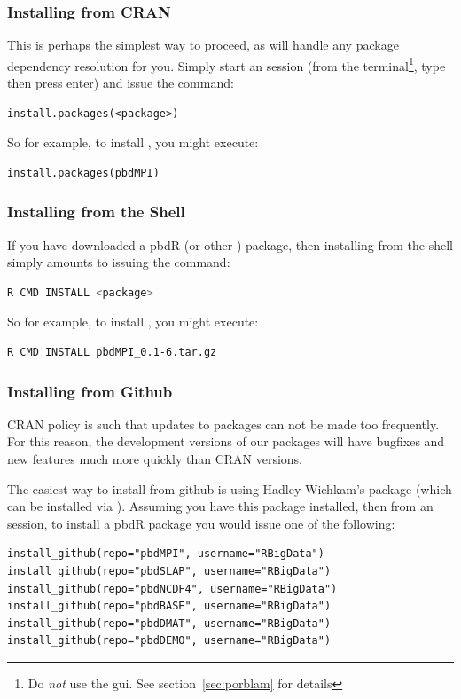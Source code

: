 \subsubsection{Installing from CRAN}
This is perhaps the simplest way to proceed, as  will handle any package dependency resolution for you.  Simply start an  session (from the terminal\footnote{Do \emph{not} use the gui.  See section~\ref{sec:porblam} for details}, type  then press enter) and issue the command:
\begin{lstlisting}[language=rr]
install.packages(<package>)
\end{lstlisting}
So for example, to install , you might execute:
\begin{lstlisting}[language=rr]
install.packages(pbdMPI)
\end{lstlisting}


\subsubsection{Installing from the Shell}
If you have downloaded a pbdR (or other ) package, then installing from the shell simply amounts to issuing the command:
\begin{lstlisting}[language=sh]
R CMD INSTALL <package>
\end{lstlisting}
So for example, to install , you might execute:
\begin{lstlisting}[language=sh]
R CMD INSTALL pbdMPI_0.1-6.tar.gz
\end{lstlisting}


\subsubsection{Installing from Github}
CRAN policy is such that updates to packages can not be made too frequently.  For this reason, the development versions of our packages will have bugfixes and new features much more quickly than CRAN versions.  

The easiest way to install from github is using Hadley Wichkam's  package (which can be installed via ).  Assuming you have this package installed, then from an  session, to install a pbdR package you would issue one of the following:

\begin{lstlisting}[language=rr]
install_github(repo="pbdMPI", username="RBigData")
install_github(repo="pbdSLAP", username="RBigData")
install_github(repo="pbdNCDF4", username="RBigData")
install_github(repo="pbdBASE", username="RBigData")
install_github(repo="pbdDMAT", username="RBigData")
install_github(repo="pbdDEMO", username="RBigData")
\end{lstlisting}

